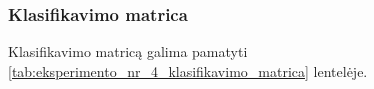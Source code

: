 \subsubsection{Klasifikavimo matrica}
\label{subsubsec:eksperimentas_nr_4_klasifikavimo_matrica}

Klasifikavimo matricą galima pamatyti \ref{tab:eksperimento_nr_4_klasifikavimo_matrica} lentelėje.

